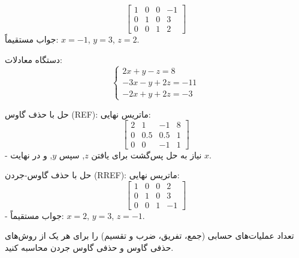 \begin{nokteh}
\[
\begin{bmatrix}
	1 & 0 & 0 & -1 \\
	0 & 1 & 0 & 3 \\
	0 & 0 & 1 & 2
\end{bmatrix}
\]
 جواب مستقیماً: \( x = -1 \), \( y = 3 \), \( z = 2 \).
\end{nokteh}

\begin{example}
دستگاه معادلات:
\[
\begin{cases}
	2x + y - z = 8 \\
	-3x - y + 2z = -11 \\
	-2x + y + 2z = -3
\end{cases}
\]

حل با حذف گاوس (REF):
ماتریس نهایی:
\[
\begin{bmatrix}
	2 & 1 & -1 & 8 \\
	0 & 0.5 & 0.5 & 1 \\
	0 & 0 & -1 & 1
\end{bmatrix}
\]
- نیاز به حل پس‌گشت برای یافتن \( z \), سپس \( y \), و در نهایت \( x \).

حل با حذف گاوس-جردن (RREF):
ماتریس نهایی:
\[
\begin{bmatrix}
	1 & 0 & 0 & 2 \\
	0 & 1 & 0 & 3 \\
	0 & 0 & 1 & -1
\end{bmatrix}
\]
- جواب مستقیماً: \( x = 2 \), \( y = 3 \), \( z = -1 \).
\end{example}
\begin{exercise}
	تعداد عملیات‌های حسابی (جمع، تفریق، ضرب و تقسیم) را برای هر یک از روش‌های حذفی گاوس و حذفی گاوس جردن محاسبه کنید.
\end{exercise}